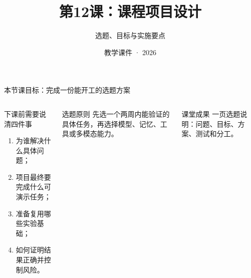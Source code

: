 

\title{第12课：课程项目设计}
\subtitle{选题、目标与实施要点}
\author{}
\date{教学课件 · 2026}


\maketitle

\begin{frame}{本节课目标：完成一份能开工的选题方案}
  \begin{columns}[T,onlytextwidth]
      \begin{block}{下课前需要说清四件事}
        \begin{enumerate}
          \item 为谁解决什么具体问题；
          \item 项目最终要完成什么可演示任务；
          \item 准备复用哪些实验基础；
          \item 如何证明结果正确并控制风险。
        \end{enumerate}
      \end{block}
      \begin{alertblock}{选题原则}
        先选一个两周内能验证的具体任务，再选择模型、记忆、工具或多模态能力。
      \end{alertblock}
      \begin{block}{课堂成果}
        一页选题说明：问题、目标、方案、测试和分工。
      \end{block}
  \end{columns}
\end{frame}

